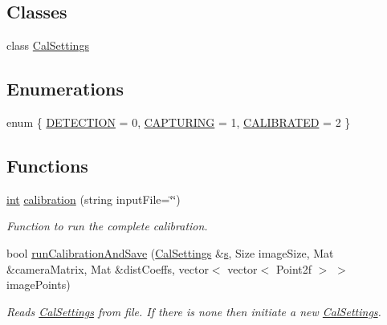 \subsection*{Classes}
\begin{DoxyCompactItemize}
\item 
class \mbox{\hyperlink{class_cal_settings}{Cal\+Settings}}
\end{DoxyCompactItemize}
\subsection*{Enumerations}
\begin{DoxyCompactItemize}
\item 
enum \{ \mbox{\hyperlink{calibration_8hh_a06fc87d81c62e9abb8790b6e5713c55ba167a7ee1aabe9f27e010fff93c0ba971}{D\+E\+T\+E\+C\+T\+I\+ON}} = 0, 
\mbox{\hyperlink{calibration_8hh_a06fc87d81c62e9abb8790b6e5713c55ba53f5d985011ab26db21516188f46a94f}{C\+A\+P\+T\+U\+R\+I\+NG}} = 1, 
\mbox{\hyperlink{calibration_8hh_a06fc87d81c62e9abb8790b6e5713c55baf7834eaf5a327e180e039aa05dd3ebd1}{C\+A\+L\+I\+B\+R\+A\+T\+ED}} = 2
 \}
\end{DoxyCompactItemize}
\subsection*{Functions}
\begin{DoxyCompactItemize}
\item 
\mbox{\hyperlink{draw_8hh_aa620a13339ac3a1177c86edc549fda9b}{int}} \mbox{\hyperlink{calibration_8hh_aad0d20455c4c17ca2922fec15835fe94}{calibration}} (string input\+File=\char`\"{}\char`\"{})
\begin{DoxyCompactList}\small\item\em Function to run the complete calibration. \end{DoxyCompactList}\item 
bool \mbox{\hyperlink{calibration_8hh_a4195037da024926ac4f645bd09700052}{run\+Calibration\+And\+Save}} (\mbox{\hyperlink{class_cal_settings}{Cal\+Settings}} \&\mbox{\hyperlink{detection_8cc_a9090f9756293390c57567a0bf7630abf}{s}}, Size image\+Size, Mat \&camera\+Matrix, Mat \&dist\+Coeffs, vector$<$ vector$<$ Point2f $>$ $>$ image\+Points)
\begin{DoxyCompactList}\small\item\em Reads \mbox{\hyperlink{class_cal_settings}{Cal\+Settings}} from file. If there is none then initiate a new {\ttfamily \mbox{\hyperlink{class_cal_settings}{Cal\+Settings}}}. \end{DoxyCompactList}\end{DoxyCompactItemize}


